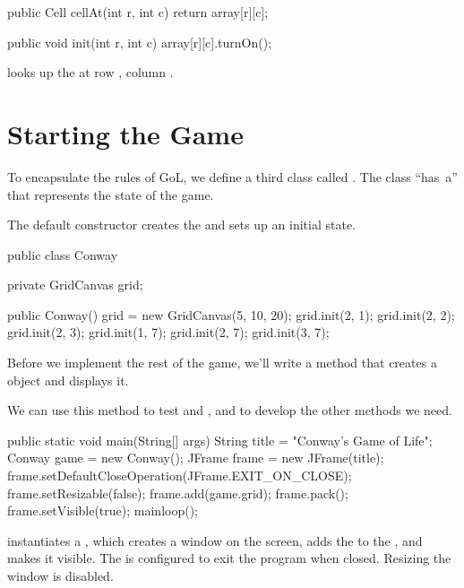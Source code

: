 \begin{code}
public Cell cellAt(int r, int c) {
    return array[r][c];
}

public void init(int r, int c) {
    array[r][c].turnOn();
}
\end{code}

 looks up the  at row , column .




\section{Starting the Game}

To encapsulate the rules of GoL, we define a third class called .
The  class ``has~a''  that represents the state of the game.

The default constructor creates the  and sets up an initial state.

\begin{code}
public class Conway {
    private GridCanvas grid;

    public Conway() {
        grid = new GridCanvas(5, 10, 20);
        grid.init(2, 1);
        grid.init(2, 2);
        grid.init(2, 3);
        grid.init(1, 7);
        grid.init(2, 7);
        grid.init(3, 7);
    }
}
\end{code}


Before we implement the rest of the game, we'll write a  method that creates a  object and displays it.

We can use this method to test  and , and to develop the other methods we need.

\begin{code}
public static void main(String[] args) {
    String title = "Conway's Game of Life";
    Conway game = new Conway();
    JFrame frame = new JFrame(title);
    frame.setDefaultCloseOperation(JFrame.EXIT_ON_CLOSE);
    frame.setResizable(false);
    frame.add(game.grid);
    frame.pack();
    frame.setVisible(true);
    mainloop();
}
\end{code}

 instantiates a , which creates a window on the screen, adds the  to the , and makes it visible.
The  is configured to exit the program when closed.
Resizing the window is disabled.

